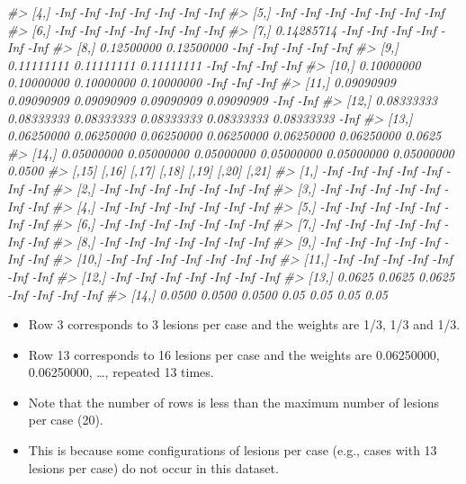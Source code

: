 \documentclass[
]{book}
\newenvironment{Shaded}{\begin{snugshade}}{\end{snugshade}}
\newcommand{\CommentTok}[1]{\textcolor[rgb]{0.56,0.35,0.01}{\textit{#1}}}
\providecommand{\tightlist}{%
  \setlength{\itemsep}{0pt}\setlength{\parskip}{0pt}}
\begin{document}
\begin{Shaded}
\begin{Highlighting}[]
\CommentTok{#>  [4,]       -Inf       -Inf       -Inf       -Inf       -Inf       -Inf   -Inf}
\CommentTok{#>  [5,]       -Inf       -Inf       -Inf       -Inf       -Inf       -Inf   -Inf}
\CommentTok{#>  [6,]       -Inf       -Inf       -Inf       -Inf       -Inf       -Inf   -Inf}
\CommentTok{#>  [7,] 0.14285714       -Inf       -Inf       -Inf       -Inf       -Inf   -Inf}
\CommentTok{#>  [8,] 0.12500000 0.12500000       -Inf       -Inf       -Inf       -Inf   -Inf}
\CommentTok{#>  [9,] 0.11111111 0.11111111 0.11111111       -Inf       -Inf       -Inf   -Inf}
\CommentTok{#> [10,] 0.10000000 0.10000000 0.10000000 0.10000000       -Inf       -Inf   -Inf}
\CommentTok{#> [11,] 0.09090909 0.09090909 0.09090909 0.09090909 0.09090909       -Inf   -Inf}
\CommentTok{#> [12,] 0.08333333 0.08333333 0.08333333 0.08333333 0.08333333 0.08333333   -Inf}
\CommentTok{#> [13,] 0.06250000 0.06250000 0.06250000 0.06250000 0.06250000 0.06250000 0.0625}
\CommentTok{#> [14,] 0.05000000 0.05000000 0.05000000 0.05000000 0.05000000 0.05000000 0.0500}
\CommentTok{#>        [,15]  [,16]  [,17] [,18] [,19] [,20] [,21]}
\CommentTok{#>  [1,]   -Inf   -Inf   -Inf  -Inf  -Inf  -Inf  -Inf}
\CommentTok{#>  [2,]   -Inf   -Inf   -Inf  -Inf  -Inf  -Inf  -Inf}
\CommentTok{#>  [3,]   -Inf   -Inf   -Inf  -Inf  -Inf  -Inf  -Inf}
\CommentTok{#>  [4,]   -Inf   -Inf   -Inf  -Inf  -Inf  -Inf  -Inf}
\CommentTok{#>  [5,]   -Inf   -Inf   -Inf  -Inf  -Inf  -Inf  -Inf}
\CommentTok{#>  [6,]   -Inf   -Inf   -Inf  -Inf  -Inf  -Inf  -Inf}
\CommentTok{#>  [7,]   -Inf   -Inf   -Inf  -Inf  -Inf  -Inf  -Inf}
\CommentTok{#>  [8,]   -Inf   -Inf   -Inf  -Inf  -Inf  -Inf  -Inf}
\CommentTok{#>  [9,]   -Inf   -Inf   -Inf  -Inf  -Inf  -Inf  -Inf}
\CommentTok{#> [10,]   -Inf   -Inf   -Inf  -Inf  -Inf  -Inf  -Inf}
\CommentTok{#> [11,]   -Inf   -Inf   -Inf  -Inf  -Inf  -Inf  -Inf}
\CommentTok{#> [12,]   -Inf   -Inf   -Inf  -Inf  -Inf  -Inf  -Inf}
\CommentTok{#> [13,] 0.0625 0.0625 0.0625  -Inf  -Inf  -Inf  -Inf}
\CommentTok{#> [14,] 0.0500 0.0500 0.0500  0.05  0.05  0.05  0.05}
\end{Highlighting}
\end{Shaded}

\begin{itemize}
\tightlist
\item
  Row 3 corresponds to 3 lesions per case and the weights are 1/3, 1/3 and 1/3.
\item
  Row 13 corresponds to 16 lesions per case and the weights are 0.06250000, 0.06250000, \ldots, repeated 13 times.
\item
  Note that the number of rows is less than the maximum number of lesions per case (20).
\item
  This is because some configurations of lesions per case (e.g., cases with 13 lesions per case) do not occur in this dataset.
\end{itemize}
\end{document}
